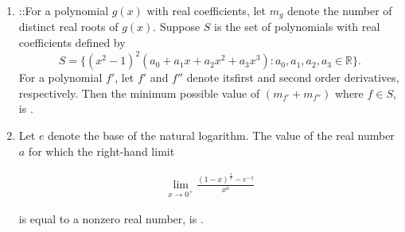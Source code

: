 \documentclass{article}
\begin{document}
\begin{enumerate}
\item   ::For a polynomial $g(x)$ with real coefficients, let $m_g$ denote the number of distinct real roots of $g(x)$. Suppose $S$ is the set of polynomials with real coefficients defined by\[S = \{(x^2 - 1)^2 (a_0 + a_1 x + a_2 x^2 + a_3 x^3) : a_0, a_1, a_2, a_3 \in \mathbb{R} \}.\]For a polynomial $f'$, let $f'$ and $f''$ denote itsfirst and second order derivatives, respectively. Then the minimum possible value of $(m_{f'} + m_{f''})$ where $f \in S$, is \underline{\hspace{2cm}}.

\item   Let $e$ denote the base of the natural logarithm. The value of the real number $a$ for which the right-hand limit

\begin{align}
\lim_{x \to 0^+} \frac{(1 - x)^{\frac{1}{x}} - e^{-1}}{x^a}
\end{align}

    is equal to a nonzero real number, is \underline{\hspace{2cm}}.


\end{enumerate}
\end{document}
